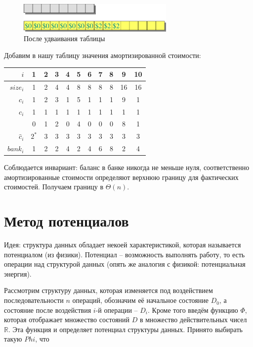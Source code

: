 \documentclass[a4paper,11pt]{article}
\begin{document}
\begin{figure}[ht]
  \centering
  \includegraphics[width=3in]{lecture13/accountant3.eps}
  \caption{После удваивания таблицы}
  \label{fig:acc3}
\end{figure}

Добавим в нашу таблицу значения амортизированной стоимости:

\begin{center}
\begin{tabular}{|r|c|c|c|c|c|c|c|c|c|c|}
  \hline
      $i$ & 1 & 2 & 3 & 4 & 5 & 6 & 7 & 8 & 9  & 10 \\
  \hline
 $size_i$ & 1 & 2 & 4 & 4 & 8 & 8 & 8 & 8 & 16 & 16 \\
  \hline
    $c_i$ & 1 & 2 & 3 & 1 & 5 & 1 & 1 & 1 & 9  & 1 \\
  \hline
    $c_i$ & 1 & 1 & 1 & 1 & 1 & 1 & 1 & 1 & 1 & 1 \\
          & 0 & 1 & 2 & 0 & 4 & 0 & 0 & 0 & 8 & 1 \\
  \hline
$\hat{c}_i$ & $2^*$ & 3 & 3 & 3 & 3 & 3 & 3 & 3 & 3 & 3 \\
  \hline
   $bank_i$ & 1 & 2 & 2 & 4 & 2 & 4 & 6 & 8 & 2 & 4 \\  
  \hline
\end{tabular}
\end{center}

Соблюдается инвариант: баланс в банке никогда не меньше нуля, соответственно
амортизированные стоимости определяют верхнюю границу для фактических
стоимостей. Получаем границу в $\Theta(n)$.


\section{Метод потенциалов}

Идея: структура данных обладает некоей характеристикой, которая называется
потенциалом (из физики). Потенциал -- возможность выполнять работу, то есть
операции над структурой данных (опять же аналогия с физикой: потенциальная
энергия).

Рассмотрим структуру данных, которая изменяется под воздействием
последовательности $n$ операций, обозначим её начальное состояние $D_0$, а
состояние после воздействия $i$-й операции -- $D_i$. Кроме того введём функцию
$\Phi$, которая отображает множество состояний $D$ в множество действительных
чисел $\mathbb{R}$. Эта функция и определяет потенциал структуры данных. Принято
выбирать такую $Phi$, что
\end{document}
